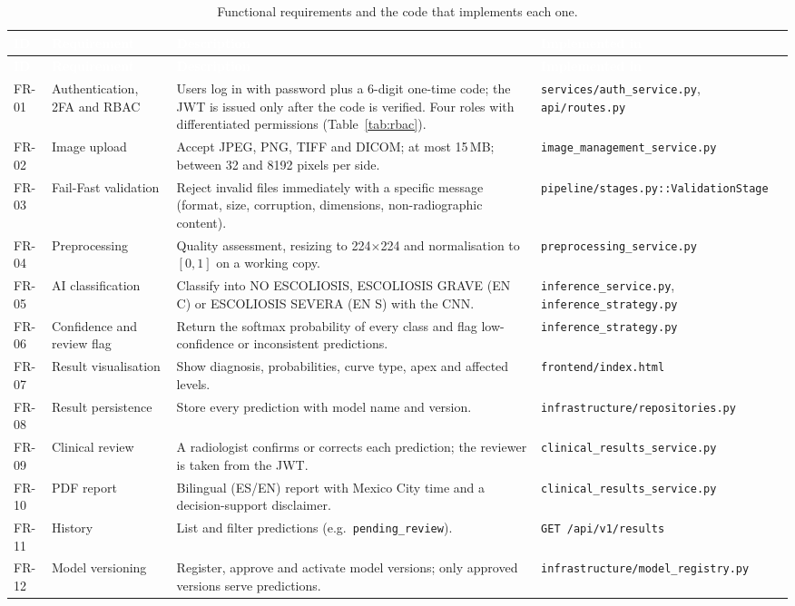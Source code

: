 \documentclass[12pt,a4paper]{article}
\newcommand{\fp}[1]{\nolinkurl{#1}}
\newcommand{\hd}[1]{\textcolor{white}{\textbf{#1}}}
\begin{document}
\begin{longtable}{C{1.1cm} L{2.6cm} p{6.4cm} L{3.4cm}}
\caption{Functional requirements and the code that implements each one.}\label{tab:functional}\\
\hd{ID} & \hd{Requirement} & \hd{Description} & \hd{Implemented in} \\
\endfirsthead
{}
\hd{ID} & \hd{Requirement} & \hd{Description} & \hd{Implemented in} \\
\endhead
{}
FR-01 & Authentication, 2FA and RBAC & Users log in with password plus a 6-digit one-time code; the JWT is issued only after the code is verified. Four roles with differentiated permissions (Table~\ref{tab:rbac}). & \fp{services/auth_service.py}, \texttt{api/routes.py} \\
FR-02 & Image upload & Accept JPEG, PNG, TIFF and DICOM; at most 15\,MB; between 32 and 8192 pixels per side. & \fp{image_management_service.py} \\
FR-03 & Fail-Fast validation & Reject invalid files immediately with a specific message (format, size, corruption, dimensions, non-radiographic content). & \fp{pipeline/stages.py::ValidationStage} \\
FR-04 & Preprocessing & Quality assessment, resizing to 224$\times$224 and normalisation to $[0,1]$ on a working copy. & \fp{preprocessing_service.py} \\
FR-05 & AI classification & Classify into NO ESCOLIOSIS, ESCOLIOSIS GRAVE (EN C) or ESCOLIOSIS SEVERA (EN S) with the CNN. & \fp{inference_service.py}, \fp{inference_strategy.py} \\
FR-06 & Confidence and review flag & Return the softmax probability of every class and flag low-confidence or inconsistent predictions. & \fp{inference_strategy.py} \\
FR-07 & Result visualisation & Show diagnosis, probabilities, curve type, apex and affected levels. & \fp{frontend/index.html} \\
FR-08 & Result persistence & Store every prediction with model name and version. & \fp{infrastructure/repositories.py} \\
FR-09 & Clinical review & A radiologist confirms or corrects each prediction; the reviewer is taken from the JWT. & \fp{clinical_results_service.py} \\
FR-10 & PDF report & Bilingual (ES/EN) report with Mexico City time and a decision-support disclaimer. & \fp{clinical_results_service.py} \\
FR-11 & History & List and filter predictions (e.g.\ \texttt{pending\_review}). & \texttt{GET /api/v1/results} \\
FR-12 & Model versioning & Register, approve and activate model versions; only approved versions serve predictions. & \fp{infrastructure/model_registry.py} \\
\end{longtable}
\end{document}
